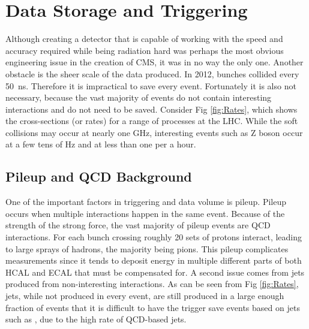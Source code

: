 \section{Data Storage and Triggering}
Although creating a detector that is capable of working with the speed and accuracy required while being radiation hard was perhaps the most obvious engineering issue in the creation of CMS, it was in no way the only one. Another obstacle is the sheer scale of the data produced. In 2012, bunches collided every  \SI{50}{\nano\second}. Therefore it is impractical to save every event. Fortunately it is also not necessary, because the vast majority of events do not contain interesting interactions and do not need to be saved. Consider Fig \ref{fig:Rates}, which shows the cross-sections (or rates) for a range of processes at the LHC. While the soft collisions may occur at nearly one GHz, interesting events such as Z boson occur at a few tens of Hz and \higgstogammagamma at less than one per a hour.
\subsection{Pileup and QCD Background}
\label{Sec:Pileup}
One of the important factors in triggering and data volume is pileup. Pileup occurs when multiple interactions happen in the same event. Because of the strength of the strong force, the vast majority of pileup events are QCD interactions. For each bunch crossing roughly 20 sets of protons interact, leading to large sprays of hadrons, the majority being pions. This pileup complicates measurements since it tends to deposit energy in multiple different parts of both HCAL and ECAL that must be compensated for. 
A second issue comes from jets produced from non-interesting interactions. As can be seen from Fig \ref{fig:Rates}, jets, while not produced in every event, are still produced in a large enough fraction of events that it is difficult to have the trigger save events based on jets such as \Wtoqq, due to the high rate of QCD-based jets. 

